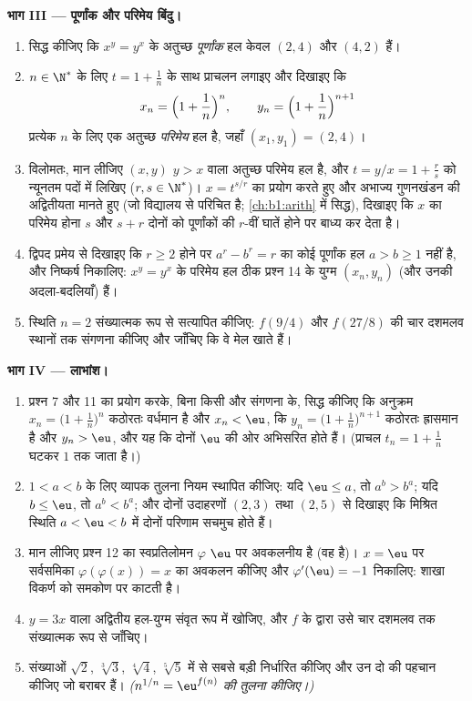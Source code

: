 \begin{problem}
\medskip \noindent\textbf{भाग III --- पूर्णांक और परिमेय बिंदु।}
\begin{enumerate}[resume]
  \item सिद्ध कीजिए कि $x^y = y^x$ के अतुच्छ \emph{पूर्णांक} हल केवल $(2,
  4)$ और $(4, 2)$ हैं।
  \item $n \in \N^*$ के लिए $t = 1 + \frac1n$ के साथ प्राचलन लगाइए और दिखाइए
  कि
        \[
        x_n = \Bigl(1 + \frac1n\Bigr)^{n},
        \qquad
        y_n = \Bigl(1 + \frac1n\Bigr)^{n+1}
        \]
        प्रत्येक $n$ के लिए एक अतुच्छ \emph{परिमेय} हल है, जहाँ $(x_1, y_1)
        = (2, 4)$।
  \item विलोमतः, मान लीजिए $(x, y)$ $y > x$ वाला अतुच्छ परिमेय हल है, और $t
  = y/x = 1 + \frac rs$ को न्यूनतम पदों में लिखिए ($r, s \in \N^*$)। $x =
  t^{s/r}$ का प्रयोग करते हुए और अभाज्य गुणनखंडन की अद्वितीयता मानते हुए (जो
  विद्यालय से परिचित है; \cref{ch:b1:arith} में सिद्ध), दिखाइए कि $x$ का
  परिमेय होना $s$ और $s + r$ दोनों को पूर्णांकों की $r$-वीं घातें होने पर
  बाध्य कर देता है।
  \item द्विपद प्रमेय से दिखाइए कि $r \geq 2$ होने पर $a^r - b^r = r$ का कोई
  पूर्णांक हल $a > b \geq 1$ नहीं है, और निष्कर्ष निकालिए: $x^y = y^x$ के
  परिमेय हल ठीक प्रश्न 14 के युग्म $(x_n, y_n)$ (और उनकी अदला-बदलियाँ) हैं।
  \item स्थिति $n = 2$ संख्यात्मक रूप से सत्यापित कीजिए: $f(9/4)$ और
  $f(27/8)$ की चार दशमलव स्थानों तक संगणना कीजिए और जाँचिए कि वे मेल खाते
  हैं।
\end{enumerate}

\medskip \noindent\textbf{भाग IV --- लाभांश।}
\begin{enumerate}[resume]
  \item प्रश्न 7 और 11 का प्रयोग करके, बिना किसी और संगणना के, सिद्ध कीजिए
  कि अनुक्रम $x_n = \bigl(1 + \frac1n\bigr)^n$ कठोरतः वर्धमान है और $x_n <
  \eu$, कि $y_n = \bigl(1 + \frac1n\bigr)^{n+1}$ कठोरतः ह्रासमान है और $y_n
  > \eu$, और यह कि दोनों $\eu$ की ओर अभिसरित होते हैं। (प्राचल $t_n = 1 +
  \frac1n$ घटकर $1$ तक जाता है।)
  \item $1 < a < b$ के लिए व्यापक तुलना नियम स्थापित कीजिए: यदि $\eu \leq
  a$, तो $a^b > b^a$; यदि $b \leq \eu$, तो $a^b < b^a$; और दोनों उदाहरणों
  $(2, 3)$ तथा $(2, 5)$ से दिखाइए कि मिश्रित स्थिति $a < \eu < b$ में दोनों
  परिणाम सचमुच होते हैं।
  \item मान लीजिए प्रश्न 12 का स्वप्रतिलोमन $\varphi$ $\eu$ पर अवकलनीय है
  (वह है)। $x = \eu$ पर सर्वसमिका $\varphi(\varphi(x)) = x$ का अवकलन कीजिए
  और $\varphi'(\eu) = -1$ निकालिए: शाखा विकर्ण को समकोण पर काटती है।
  \item $y = 3x$ वाला अद्वितीय हल-युग्म संवृत रूप में खोजिए, और $f$ के
  द्वारा उसे चार दशमलव तक संख्यात्मक रूप से जाँचिए।
  \item संख्याओं $\sqrt2$, $\sqrt[3]3$, $\sqrt[4]4$, $\sqrt[5]5$ में से सबसे
  बड़ी निर्धारित कीजिए और उन दो की पहचान कीजिए जो बराबर हैं। \emph{($n^{1/n}
  = \eu^{f(n)}$ की तुलना कीजिए।)}
\end{enumerate}


\end{problem}
